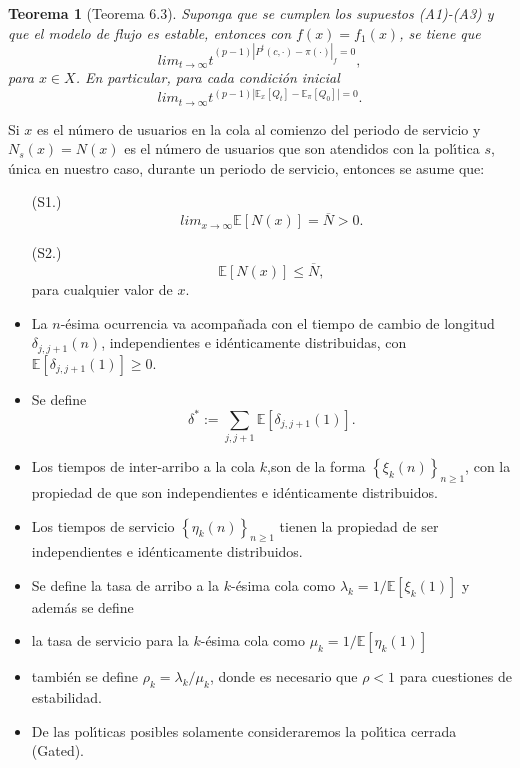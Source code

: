 \documentclass{article}
\newtheorem{Teo}{Teorema}[section]
\newcommand{\esp}{\mathbb{E}}
\numberwithin{equation}{section}
\begin{document}
\begin{Teo}[Teorema 6.3\cite{DaiSean}]\label{Tma.6.3}
Suponga que se cumplen los supuestos (A1)-(A3) y que el modelo de flujo es estable, entonces con $f\left(x\right)=f_{1}\left(x\right)$, se tiene que \[lim_{t\rightarrow\infty}t^{(p-1)\left|P^{t}\left(c,\cdot\right)-\pi\left(\cdot\right)\right|_{f}=0},\] para $x\in X$. En particular, para cada condici\'on inicial \[lim_{t\rightarrow\infty}t^{(p-1)\left|\esp_{x}\left[Q_{t}\right]-\esp_{\pi}\left[Q_{0}\right]\right|=0}.\]
\end{Teo}


Si $x$ es el n{\'u}mero de usuarios en la cola al comienzo del periodo de servicio y $N_{s}\left(x\right)=N\left(x\right)$ es el n{\'u}mero de usuarios que son atendidos con la pol{\'\i}tica $s$, {\'u}nica en nuestro caso, durante un periodo de servicio, entonces se asume que:
\begin{itemize}
\item[(S1.)]
\begin{equation}\label{S1}
lim_{x\rightarrow\infty}\esp\left[N\left(x\right)\right]=\overline{N}>0.
\end{equation}
\item[(S2.)]
\begin{equation}\label{S2}
\esp\left[N\left(x\right)\right]\leq \overline{N}, \end{equation}
para cualquier valor de $x$. \item La $n$-{\'e}sima ocurrencia va acompa{\~n}ada con el tiempo de cambio de longitud $\delta_{j,j+1}\left(n\right)$, independientes e id{\'e}nticamente distribuidas, con $\esp\left[\delta_{j,j+1}\left(1\right)\right]\geq0$. \item Se
define
\begin{equation}
\delta^{*}:=\sum_{j,j+1}\esp\left[\delta_{j,j+1}\left(1\right)\right].
\end{equation}

\item Los tiempos de inter-arribo a la cola $k$,son de la forma
$\left\{\xi_{k}\left(n\right)\right\}_{n\geq1}$, con la propiedad de que son independientes e id{\'e}nticamente distribuidos.

\item Los tiempos de servicio
$\left\{\eta_{k}\left(n\right)\right\}_{n\geq1}$ tienen la propiedad de ser independientes e id{\'e}nticamente distribuidos.

\item Se define la tasa de arribo a la $k$-{\'e}sima cola como $\lambda_{k}=1/\esp\left[\xi_{k}\left(1\right)\right]$ y adem{\'a}s se define

\item la tasa de servicio para la $k$-{\'e}sima cola como
$\mu_{k}=1/\esp\left[\eta_{k}\left(1\right)\right]$

\item tambi{\'e}n se define $\rho_{k}=\lambda_{k}/\mu_{k}$, donde es necesario que $\rho<1$ para cuestiones de estabilidad.

\item De las pol{\'\i}ticas posibles solamente consideraremos la pol{\'\i}tica cerrada (Gated).
\end{itemize}
\end{document}
